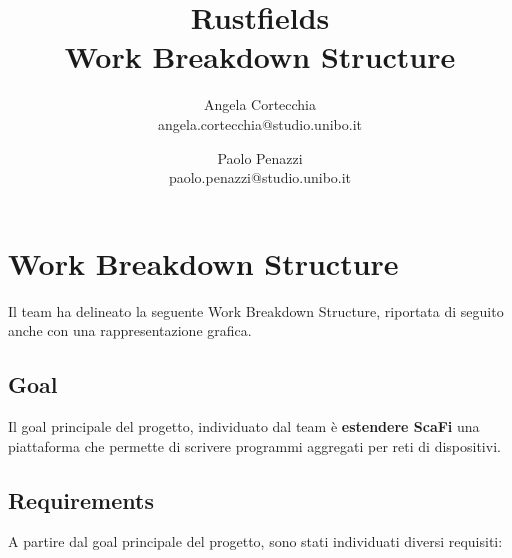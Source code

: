 \documentclass[12pt, a4paper]{article}
\title{\LARGE
    Rustfields \\ 
    \small
    Work Breakdown Structure
    }
\author{
    Angela Cortecchia \\ 
    \small 
    angela.cortecchia@studio.unibo.it
    \and
    Paolo Penazzi \\ 
    \small
    paolo.penazzi@studio.unibo.it
}
\date{\small }
\begin{document}
\maketitle
\newpage


\section*{Work Breakdown Structure}

Il team ha delineato la seguente Work Breakdown Structure, riportata di seguito anche con una
rappresentazione grafica.

\subsection*{Goal}

Il goal principale del progetto, individuato dal team è \textbf{estendere ScaFi } una piattaforma che permette
di scrivere programmi aggregati per reti di dispositivi.

\subsection*{Requirements}

A partire dal goal principale del progetto, sono stati individuati diversi requisiti:
\end{document}
